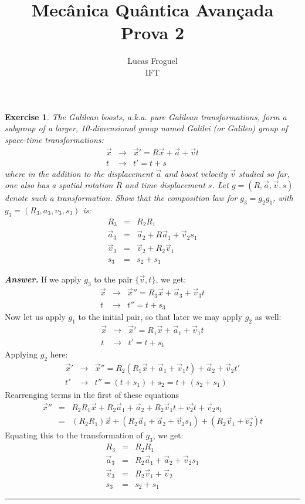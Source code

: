 \documentclass[12pt]{article}
\title{Mecânica Quântica Avançada \\ Prova 2}
\author{Lucas Froguel \\ IFT}
\date{}
\def\bea{\begin{eqnarray*}}
\def\eea{\end{eqnarray*}}
\newtheorem{exercise}{Exercise}
\newenvironment{answer}{\noindent\textbf{\textit{Answer.}} \normalfont }{\par\noindent\rule{\textwidth}{0.4pt}}
\begin{document}
	\maketitle
	\listoftheorems[title={Prova 2}]
	
	\begin{exercise}
		The Galilean boosts, a.k.a. pure Galilean transformations, form a
		subgroup of a larger, 10-dimensional group named Galilei (or Galileo) group of space-time transformations:
		\bea
		\vec{x} &\to& \vec{x}'=R\vec{x} + \vec{a} + \vec{v}t \\
		t &\to& t' = t + s
		\eea
		where in the addition to the displacement $\vec{a}$ and boost velocity	 $\vec{v}$ studied so far, one also has a spatial rotation $R$ and time displacement $s$. Let $g = (R,  \vec{a}, \vec{v} , s)$ denote such a transformation. Show that the composition law for $g_3 = g_2g_1$, with $g_3 = (R_3 , a_3 , v_3 , s_3)$ is:
		\bea
		R_3 &=& R_2R_1 \\
		\vec{a}_3 &=& \vec{a}_2 + R\vec{a}_1 + \vec{v}_2s_1 \\
		\vec{v}_3 &=& \vec{v}_2 + R_2\vec{v}_1 \\
		s_3 &=& s_2 + s_1
		\eea
	\end{exercise}
	\begin{answer}
		If we apply $g_3$ to the pair $\{\vec{v}, t\}$, we get:
		\bea
		\vec{x} &\to& \vec{x}''=R_3\vec{x} + \vec{a}_3 + \vec{v}_3t \\
		t &\to& t'' = t + s_3
		\eea
		Now let us apply $g_1$ to the initial pair, so that later we may apply $g_2$ as well:
		\bea
		\vec{x} &\to& \vec{x}'= R_1\vec{x} + \vec{a}_1 + \vec{v}_1t \\
		t &\to& t' = t + s_1
		\eea
		Applying $g_2$ here:
		\bea
		\vec{x}' &\to& \vec{x}'' = R_2(R_1\vec{x} + \vec{a}_1 + \vec{v}_1t) + \vec{a}_2 + \vec{v}_2t' \\
		t' &\to& t'' = (t + s_1) + s_2 = t + (s_2 + s_1)
		\eea
		Rearrenging terms in the first of these equations
		\bea
		\vec{x}'' &=& R_2R_1\vec{x} + R_2\vec{a}_1 +\vec{a}_2 + R_2\vec{v}_1t + \vec{v_2}t + \vec{v}_2s_1 \\
		&=& (R_2R_1)\vec{x} + (R_2\vec{a}_1 +\vec{a}_2 + \vec{v}_2s_1) + (R_2\vec{v}_1 + \vec{v_2})t
		\eea
		Equating this to the transformation of $g_3$, we get:
		\bea
		R_3 &=& R_2R_1 \\
		\vec{a}_3 &=& R_2\vec{a}_1 + \vec{a}_2 + \vec{v}_2s_1 \\
		\vec{v}_3 &=& R_2\vec{v}_1 + \vec{v}_2 \\
		s_3 &=& s_2 + s_1
		\eea		
	\end{answer}
	
\end{document}
